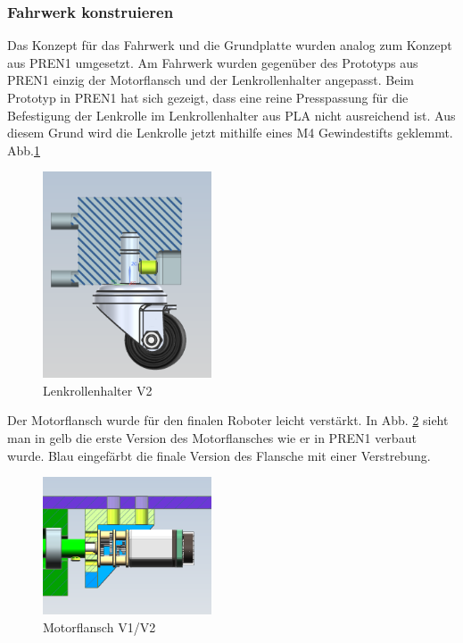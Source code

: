 \subsubsection{Fahrwerk konstruieren}
\label{Fahrwerk konstruieren}

 Das Konzept für das Fahrwerk und die Grundplatte wurden analog zum Konzept aus PREN1 umgesetzt. Am Fahrwerk wurden gegenüber des Prototyps aus PREN1 einzig der Motorflansch und der Lenkrollenhalter angepasst. Beim Prototyp in PREN1 hat sich gezeigt, dass eine reine Presspassung für die Befestigung der Lenkrolle im Lenkrollenhalter aus PLA nicht ausreichend ist. Aus diesem Grund wird die Lenkrolle jetzt mithilfe eines M4 Gewindestifts geklemmt. Abb.\ref{fig: Lenkrollenhalter V2} 

\begin{figure}[H]
\centering
\includegraphics[width=5cm]{assets/MT/Lenkrollenhalter V2.png}
\caption{Lenkrollenhalter V2}
\label{fig: Lenkrollenhalter V2}
\end{figure}

Der Motorflansch wurde für den finalen Roboter leicht verstärkt. In  Abb. \ref{fig: Motorflansch V1/V2} sieht man in gelb die erste Version des Motorflansches wie er in PREN1 verbaut wurde. Blau eingefärbt die finale Version des Flansche mit einer Verstrebung. 

\begin{figure}[H]
\centering
\includegraphics[width=5cm]{assets/MT/Motorflansch Vergleich.png}
\caption{Motorflansch V1/V2}
\label{fig: Motorflansch V1/V2}
\end{figure}

